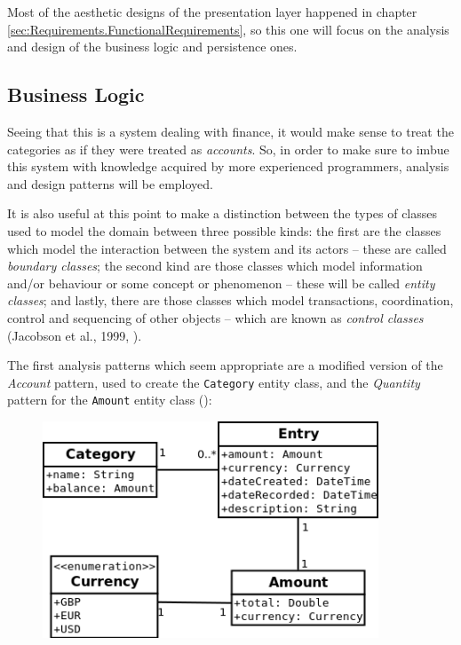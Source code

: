 Most of the aesthetic designs of the presentation layer happened in chapter
\ref{sec:Requirements.FunctionalRequirements}, so this one will focus on the
analysis and design of the business logic and persistence ones.

\subsection{Business Logic} \label{sec:AnalysisAndDesign.BusinessLogic}
Seeing that this is a system dealing with finance, it would make sense to treat
the categories as if they were treated as \emph{accounts}. So, in order to
make sure to imbue this system with knowledge acquired by more experienced
programmers, analysis and design patterns will be employed.

It is also useful at this point to make a distinction between the types of
classes used to model the domain between three possible kinds: the first are
the classes which model the interaction between the system and its actors --
these are called \emph{boundary classes}; the second kind are those classes
which model information and/or behaviour or some concept or phenomenon -- these
will be called \emph{entity classes}; and lastly, there are those classes which
model transactions, coordination, control and sequencing of other objects --
which are known as \emph{control classes} (Jacobson et al., 1999,
\cite[cited][pp.~198-201]{bennett2010object}).
%

The first analysis patterns which seem appropriate are a modified version of
the \emph{Account} pattern, used to create the \texttt{Category} entity class,
and the \emph{Quantity} pattern for the \texttt{Amount} entity class
(\cite[][Sections~6.1~\&~3.1]{fowler1997analysis}):
\begin{figure}[ht!]
  \begin{center}
    \includegraphics[width=10cm]{./contents/img/Class_Diagram_-_Categories_and_Amount.png}
  \end{center}
  \caption{}
  \label{fig:ClassDiagram.CategoriesAndAmount}
\end{figure}
\FloatBarrier

